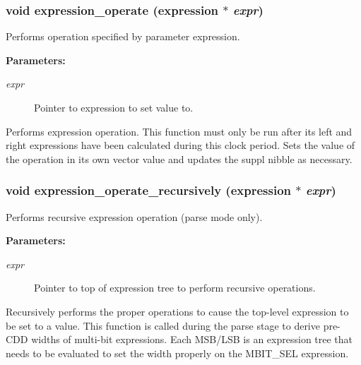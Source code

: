 \subsubsection{\setlength{\rightskip}{0pt plus 5cm}void expression\_\-operate ({\bf expression} $\ast$ {\em expr})}\label{expr_8h_a9}


Performs operation specified by parameter expression.

\begin{Desc}
\item[{\bf Parameters: }]\par
\begin{description}
\item[
{\em expr}]Pointer to expression to set value to.

\end{description}
\end{Desc}
Performs expression operation. This function must only be run after its left and right expressions have been calculated during this clock period. Sets the value of the operation in its own vector value and updates the suppl nibble as necessary. 
\subsubsection{\setlength{\rightskip}{0pt plus 5cm}void expression\_\-operate\_\-recursively ({\bf expression} $\ast$ {\em expr})}\label{expr_8h_a10}


Performs recursive expression operation (parse mode only).

\begin{Desc}
\item[{\bf Parameters: }]\par
\begin{description}
\item[
{\em expr}]Pointer to top of expression tree to perform recursive operations.

\end{description}
\end{Desc}
Recursively performs the proper operations to cause the top-level expression to be set to a value. This function is called during the parse stage to derive  pre-CDD widths of multi-bit expressions. Each MSB/LSB is an expression tree that  needs to be evaluated to set the width properly on the MBIT\_\-SEL expression. 
